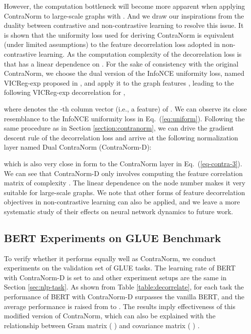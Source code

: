 \documentclass{article}
\theoremstyle{definition}
\theoremstyle{remark}
\theoremstyle{theorem}
\begin{document}
However, the computation bottleneck will become more apparent when applying ContraNorm to large-scale graphs with . And we draw our inspirations from the duality between contrastive and non-contrastive learning \citep{garrido2022duality} to resolve this issue. It is shown that the uniformity loss used for deriving ContraNorm is equivalent (under limited assumptions) to the feature decorrelation loss adopted in non-contrastive learning. As the computation complexity of the decorrelation loss is  that has a linear dependence on . For the sake of consistency with the original ContraNorm, we choose the dual version of the InfoNCE uniformity loss, named VICReg-exp proposed in \cite{garrido2022duality}, and apply it to the graph features , leading to the following VICReg-exp decorrelation for ,

where  denotes the -th column vector (i.e., a feature) of . We can observe its close resemblance to the InfoNCE uniformity loss in Eq.~(\ref{eq:uniform}). Following the same procedure as in Section \ref{section:contranorm}, we can drive the gradient descent rule of the decorrelation loss and arrive at the following normalization layer named Dual ContraNorm (ContraNorm-D):

which is also very close in form to the ContraNorm layer in Eq.~(\ref{eq-contra-3}).
We can see that ContraNorm-D only involves computing the feature correlation matrix  of complexity . The linear dependence on the node number  makes it very suitable for large-scale graphs. We note that other forms of feature decorrelation objectives in non-contrastive learning \citep{zbontar2021barlow,bardes2021vicreg} can also be applied, and we leave a more systematic study of their effects on neural network dynamics to future work.


\subsection{BERT Experiments on GLUE Benchmark}

To verify whether it performs equally well as ContraNorm, we conduct experiments on the validation set of GLUE tasks. The learning rate of BERT with ContraNorm-D is set to  and other experiment setups are the same in Section \ref{sec:nlp-task}. As shown from Table \ref{table:decorrelate}, for each task the performance of BERT with ContraNorm-D surpasses the vanilla BERT, and the average performance is raised from  to . The results imply effectiveness of this modified version of ContraNorm, which can also be explained with the relationship between Gram matrix ( ) and covariance matrix ( ) \citep{ali2021xcit}. 
\end{document}
